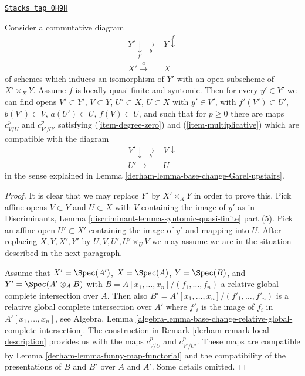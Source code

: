 \begin{lemma}
\label{derham-lemma-existence-base-change-Garel-upstairs}
\href{https://stacks.math.columbia.edu/tag/0H9H}{\texttt{Stacks tag 0H9H}}

Consider a commutative diagram
$$
\begin{array}{cc}Y' \underset{f'}{\downarrow}\underset{b}{\longrightarrow} & Y \overset{f}{\downarrow} \\ X' \overset{a}{\longrightarrow} & X\end{array}
$$
of schemes which induces an isomorphism of $Y'$ with an open subscheme of
$X' \times_X Y$. Assume $f$ is locally quasi-finite and syntomic. Then for
every $y' \in Y'$ we can find opens $V' \subset Y'$,
$V \subset Y$, $U' \subset X$, $U \subset X$ with $y' \in V'$, with
$f'(V') \subset U'$, $b(V') \subset V$, $a(U') \subset U$,
$f(V) \subset U$, and such that for $p \geq 0$ there are maps
$c^p_{V/U}$ and $c^p_{V'/U'}$ satisfying (\ref{item-degree-zero})
and (\ref{item-multiplicative}) which are compatible with the diagram
$$
\begin{array}{cc}V' \downarrow\underset{b}{\longrightarrow} & V \downarrow \\ U' \longrightarrow & U\end{array}
$$
in the sense explained in Lemma \ref{derham-lemma-base-change-Garel-upstairs}.
\end{lemma}

\begin{proof}

It is clear that we may replace $Y'$ by $X' \times_X Y$ in order to prove this.
Pick affine opens $V \subset Y$ and $U \subset X$ with $V$ containing
the image of $y'$ as in
Discriminants, Lemma \ref{discriminant-lemma-syntomic-quasi-finite} part (5).
Pick an affine open $U' \subset X'$ containing the image of $y'$
and mapping into $U$. After replacing $X, Y, X', Y'$ by
$U, V, U', U' \times_U V$ we may assume we are in the situation
described in the next paragraph.

\medskip\noindent
Assume that $X' = \Spec(A')$, $X = \Spec(A)$, $Y = \Spec(B)$, and
$Y' = \Spec(A' \otimes_A B)$ with $B = A[x_1, \ldots, x_n]/(f_1, \ldots, f_n)$
a relative global complete intersection over $A$. Then also
$B' = A'[x_1, \ldots, x_n]/(f'_1, \ldots, f'_n)$ is a relative
global complete intersection over $A'$ where $f'_i$ is the image of $f_i$
in $A'[x_1, \ldots, x_n]$, see Algebra, Lemma
\ref{algebra-lemma-base-change-relative-global-complete-intersection}.
The construction in Remark \ref{derham-remark-local-description}
provides us with the maps $c^p_{V/U}$ and $c^p_{V'/U'}$.
These maps are compatible by Lemma \ref{derham-lemma-funny-map-functorial}
and the compatibility of the presentations of $B$ and $B'$ over
$A$ and $A'$. Some details omitted.
\end{proof}

